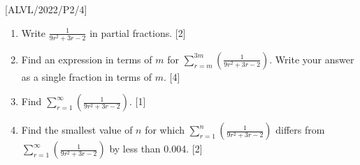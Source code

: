 \item {[}ALVL/2022/P2/4{]}
\begin{enumerate}
\item Write $\frac{1}{9r^{2}+3r-2}$ in partial fractions. \hfill{}{[}2{]}
\item Find an expression in terms of $m$ for $\sum_{r=m}^{3m}\left(\frac{1}{9r^{2}+3r-2}\right)$.
Write your answer as a single fraction in terms of $m$.\hfill{}
{[}4{]}
\item Find $\sum_{r=1}^{\infty}\left(\frac{1}{9r^{2}+3r-2}\right).$ \hfill{}{[}1{]}
\item Find the smallest value of $n$ for which $\sum_{r=1}^{n}\left(\frac{1}{9r^{2}+3r-2}\right)$
differs from $\sum_{r=1}^{\infty}\left(\frac{1}{9r^{2}+3r-2}\right)$
by less than 0.004.\hfill{} {[}2{]}
\end{enumerate}
